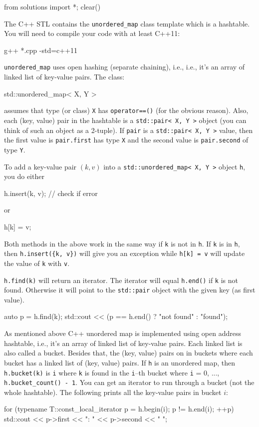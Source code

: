 \begin{python0}
from solutions import *; clear()
\end{python0}

The C++ STL contains the \verb!unordered_map! class template
which is a hashtable.
You will need to compile your code with at least C++11:
\begin{console}
g++ *.cpp -std=c++11
\end{console}
\verb!unordered_map! uses open hashing (separate chaining), i.e., 
i.e., it's an array of linked list of key-value pairs.
The class:
\begin{console}
std::unordered_map< X, Y >
\end{console}
assumes that type (or class) \verb!X! has
\verb!operator==()!
(for the obvious reason).
Also, each (key, value) pair in the hashtable
is a \verb!std::pair< X, Y >! object
(you can think of such an object as a 2-tuple).
If \verb!pair! is a
\verb!std::pair< X, Y >! value,
then the first value is \verb!pair.first! has type \verb!X!
and the second value is \verb!pair.second! of type \verb!Y!.

To add a key-value pair $(k,v)$ into a
\verb!std::unordered_map< X, Y >! object \verb!h!, you do either
\begin{console}
h.insert({k, v}); // check if error
\end{console}
or
\begin{console}
h[k] = v;
\end{console}
Both methods in the above work in the same way if \verb!k! is not in \verb!h!.
If \verb!k! is in \verb!h!, then
\verb!h.insert({k, v})! will give you an exception
while
\verb!h[k] = v! will update the value of \verb!k! with \verb!v!.

\verb!h.find(k)! will return an iterator.
The iterator will equal \verb!h.end()! if \verb!k! is not found.
Otherwise it will point to the
\verb!std::pair! object with the given key (as first value).
\begin{console}
auto p = h.find(k);
std::cout << (p == h.end() ? "not found\n" : "found\n");  
\end{console}

As mentioned above C++ unordered map is implemented using open address hashtable,
i.e., it's an array of linked list of key-value pairs.
Each linked list is also called a bucket.
Besides that, the (key, value) pairs on in buckets
where each bucket has a linked list of (key, value) pairs.
If \verb!h! is an unordered map,
then \verb!h.bucket(k)! is \verb!i! where
\verb!k! is found in the \verb!i!--th bucket
where \verb!i! = 0, ..., \verb!h.bucket_count() - 1!.
You can get an iterator to run through a bucket (not the whole hashtable).
The following prints all the key-value pairs in bucket $i$:
\begin{console}
for (typename T::const_local_iterator p = h.begin(i);
     p != h.end(i); ++p)
{
    std::cout << p->first << ": " << p->second << "  ";
}
\end{console}

